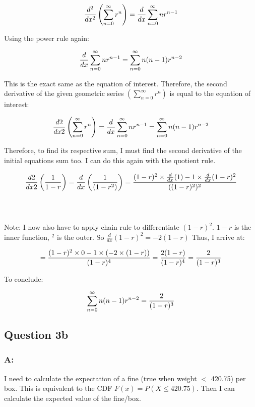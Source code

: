 \documentclass[
]{article}
\begin{document}
\[
\Large \frac{d^2}{dx^2} \left( \sum_{n=0}^{\infty} r^n \right) = \frac{d}{dx} \sum_{n=0}^{\infty} n r^{n-1}
\]

Using the power rule again:

\[
\Large
\frac{d}{dx}\sum_{n=0}^{\infty} nr^{n-1}
= \sum_{n=0}^{\infty}n(n-1)r^{n-2}
\]

This is the exact same as the equation of interest. Therefore, the
second derivative of the given geometric series
\(( \sum_{n=0}^{\infty} r^n)\) is equal to the equation of interest:

\[
\Large
\frac{d2}{dx2} \left( \sum_{n=0}^{\infty} r^n \right) = \frac{d}{dx}\sum_{n=0}^{\infty} nr^{n-1} = \sum_{n=0}^{\infty}n(n-1)r^{n-2}
\]

Therefore, to find its respective sum, I must find the second derivative
of the initial equations sum too. I can do this again with the quotient
rule.

\[
\Large
\frac{d2}{dx2} \left( \frac{1}{1 - r} \right) =
\frac{d}{dx} \left( \frac{1}{(1 - r^2)} \right) =
\frac{(1-r)^2\times\frac{d}{dx}(1)-1 \times \frac{d}{dx}(1-r)^2}{((1-r)^2)^2}
\]\\
\strut \\
Note: I now also have to apply chain rule to differentiate \((1-r)^2\).
\(1-r\) is the inner function, \(^2\) is the outer. So
\(\frac{d}{dx}(1-r)^2 = -2(1-r)\) Thus, I arrive at:

\hfill\break
\[
\Large
= \frac{(1-r)^2\times0-1 \times (-2\times(1-r))}{(1-r)^4}=\frac{2(1-r)}{(1-r)^4} =\frac{2}{(1-r)^3}
\]

To conclude:

\[
\Large
\sum_{n=0}^{\infty}n(n-1)r^{n-2} =\frac{2}{(1-r)^3}
\]

\hfill\break
\hfill\break
\hfill\break
\hfill\break
\hfill\break

\hfill\break

\hfill\break
\hfill\break
\hfill\break

\hfill\break
\hfill\break
\hfill\break

\subsection{Question 3b}\label{question-3b}

\subsubsection{A:}\label{a}

I need to calculate the expectation of a fine (true when weight \(<\)
420.75) per box. This is equivalent to the CDF \(F(x) = P(X ≤ 420.75)\).
Then I can calculate the expected value of the fine/box.
\end{document}
